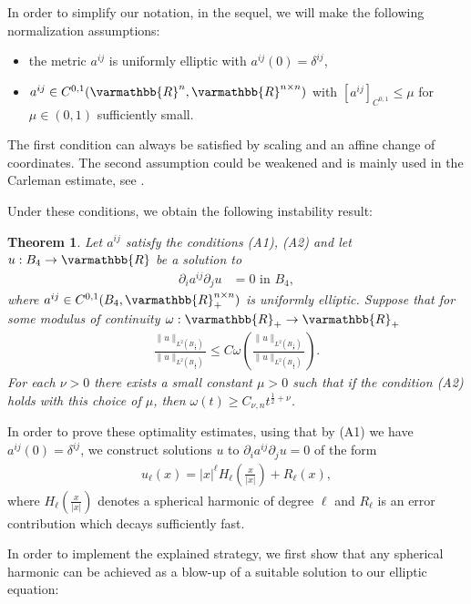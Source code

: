 \documentclass[12pt,twoside]{amsart}
\numberwithin{equation}{section}
\renewcommand{\leq}{\leqslant}
\renewcommand{\geq}{\geqslant}
\renewcommand{\mathbb}{\varmathbb}
\newtheorem{theorem}{Theorem}[section]
\newcommand {\R} {\mathbb{R}} \newcommand {\Z} {\mathbb{Z}}
\newcommand {\p} {\partial}
\begin{document}
\begin{appendix}
In order to simplify our notation, in the sequel, we will make the following normalization assumptions:
\begin{itemize}
\item[(A1)] the metric $a^{ij}$ is uniformly elliptic with $a^{ij}(0)= \delta^{ij}$,
\item[(A2)] $a^{ij}\in C^{0,1}(\R^n, \R^{n\times n})$ with $[a^{ij}]_{C^{0,1}}\leq \mu$ for $\mu \in (0,1)$ sufficiently small.
\end{itemize}
The first condition can always be satisfied by scaling and an affine change of coordinates. The second assumption could be weakened and is mainly used in the Carleman estimate, see \cite{KochTataru01}.

Under these conditions, we obtain the following instability result:



\begin{theorem}
\label{prop:three_spheres_opt}
Let $a^{ij}$ satisfy the conditions (A1), (A2) and let $u:B_4 \rightarrow \R$ be a solution to
\begin{align}
\label{eq:elliptic}
\p_i a^{ij} \p_j u & = 0 \mbox{ in } B_4,
\end{align}
where $a^{ij}\in C^{0,1}(B_4, \R^{n\times n}_+)$ is uniformly elliptic. Suppose that for some modulus of continuity $\omega: \R_+ \rightarrow \R_+$
\begin{align}
\label{eq:stab_Carl}
\frac{\|u\|_{L^2(B_{\frac{1}{4}})}}{\|u\|_{L^2(B_{\frac{1}{2}})}} \leq C\omega \left(\frac{\|u\|_{L^2(B_{\frac{1}{8}})}}{\|u\|_{L^2(B_{\frac{1}{2}})}} \right).
\end{align}
For each $\nu > 0$ there exists a small constant $\mu>0$ such that if the condition (A2) holds with this choice of $\mu$, then $\omega(t)\geq C_{\nu,n} t^{\frac{1}{2}+\nu}$.
\end{theorem}

In order to prove these optimality estimates, using that by (A1) we have $a^{ij}(0)=\delta^{ij}$, we construct solutions $u$ to $\p_i a^{ij} \p_j u = 0$ of the form 
\begin{align*}
u_{\ell}(x) = |x|^{\ell} H_{\ell}(\frac{x}{|x|}) + R_{\ell}(x),
\end{align*} 
where $H_{\ell}(\frac{x}{|x|})$ denotes a spherical harmonic of degree $\ell$ and $R_{\ell}$ is an error contribution which decays sufficiently fast.


In order to implement the explained strategy, we first show that any spherical harmonic can be achieved as a blow-up of a suitable solution to our elliptic equation:


\end{appendix}
\end{document}
